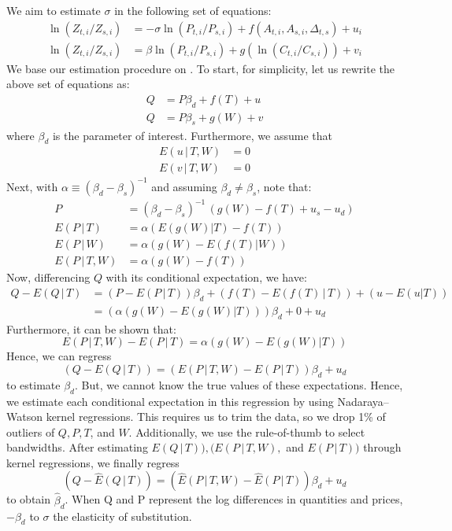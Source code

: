 \documentclass[11pt,a4paper,leqno]{extarticle}
\begin{document}
	We aim to estimate $\sigma$ in the following set of equations:
	\begin{align*}
	\ln (Z_{ t, i} / Z_{ s, i}) &= -\sigma \ln (P_{t,i} / P_{s,i}) +  f \left( A_{t,i}, A_{s,i}, \Delta_{t,s} \right) + u_i \\
	\ln (Z_{ t, i} / Z_{ s, i}) &= \beta \ln (P_{t,i} / P_{s,i}) + g \left( \ln (C_{t,i} / C_{s,i})  \right) + v_{i}
	\end{align*}
	We base our estimation procedure on \citet{Newey}. To start, for simplicity, let us rewrite the above set of equations as:
	\begin{align*}
	Q &= P \beta_d + f(T) + u \\
	Q &= P \beta_s + g(W) + v 
	\end{align*}
	where $\beta_d$ is the parameter of interest. Furthermore, we assume that 
	\begin{align*}
	E(u \, | \, T, W) &= 0 \\
	E(v \, | \, T, W) &= 0 
	\end{align*}
	Next, with $\alpha \equiv (\beta_d - \beta_s)^{-1}$ and assuming $\beta_d \neq \beta_s$, note that:
	\begin{align*}
	P &= (\beta_d - \beta_s)^{-1} \, \left(  g(W) - f(T) + u_s - u_d \right)  \\
	E(P\,|\,T)   &= \alpha \left( E(g(W)|T) - f(T)  \right)\\
	E(P\,|\,W)   &= \alpha \left( g(W) - E(f(T)|W)  \right) \\
	E(P\,|\,T,W) &= \alpha \left( g(W) - f(T)     \right) 
	\end{align*}
	Now, differencing $Q$ with its conditional expectation, we have:
	\begin{align*}
	Q - E(Q \,|\,T) &= (P - E(P\,|\,T))\beta_d + (f(T) - E(f(T) \,|\,T)) + (u - E(u|T))\\
	&= (\alpha(g(W) - E(g(W)|T)))\beta_d + 0 + u_d 
	\end{align*}
	Furthermore, it can be shown that:
	$$E(P\,|\,T,W) - E(P\,|\,T) = \alpha (g(W) - E(g(W)|T))$$
	Hence, we can regress 
	$$(Q - E(Q \,|\,T)) = (E(P\,|\,T,W) - E(P\,|\,T)) \beta_d + u_d $$
	to estimate $\beta_d$. But, we cannot know the true values of these expectations. Hence, we estimate each conditional expectation in this regression by using Nadaraya–Watson kernel regressions. This requires us to trim the data, so we drop 1\% of outliers of $Q, P, T$, and $W$. Additionally, we use the \citet{Silverman} rule-of-thumb to select bandwidths. After estimating $E(Q \,|\,T)), (E(P\,|\,T,W),$ and $E(P\,|\,T))$ through kernel regressions, we finally regress
	$$(Q - \hat{E}(Q \,|\,T)) = (\hat{E}(P\,|\,T,W) - \hat{E}(P\,|\,T)) \beta_d + u_d $$
	to obtain $\hat{\beta}_d$. When Q and P represent the log differences in quantities and prices, $-\beta_d$ to $\sigma$ the elasticity of substitution. 
	\pagebreak
	\pagebreak
	
	
\end{document}
